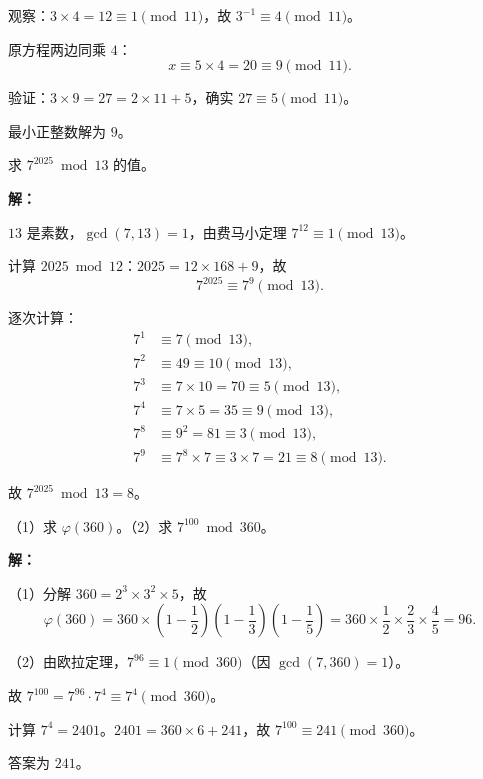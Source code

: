 \documentclass[12pt, a4paper]{ctexart}
\begin{document}
观察：$3 \times 4 = 12 \equiv 1 \pmod{11}$，故 $3^{-1} \equiv 4 \pmod{11}$。

原方程两边同乘 $4$：
\[ x \equiv 5 \times 4 = 20 \equiv 9 \pmod{11}. \]

验证：$3 \times 9 = 27 = 2 \times 11 + 5$，确实 $27 \equiv 5 \pmod{11}$。

最小正整数解为 $\boxed{9}$。

\begin{examplebox}[【例题5】费马小定理应用]
求 $7^{2025} \bmod 13$ 的值。
\end{examplebox}

\textbf{解：}

$13$ 是素数，$\gcd(7, 13) = 1$，由费马小定理 $7^{12} \equiv 1 \pmod{13}$。

计算 $2025 \bmod 12$：$2025 = 12 \times 168 + 9$，故
\[ 7^{2025} \equiv 7^9 \pmod{13}. \]

逐次计算：
\begin{align*}
7^1 &\equiv 7 \pmod{13}, \\
7^2 &\equiv 49 \equiv 10 \pmod{13}, \\
7^3 &\equiv 7 \times 10 = 70 \equiv 5 \pmod{13}, \\
7^4 &\equiv 7 \times 5 = 35 \equiv 9 \pmod{13}, \\
7^8 &\equiv 9^2 = 81 \equiv 3 \pmod{13}, \\
7^9 &\equiv 7^8 \times 7 \equiv 3 \times 7 = 21 \equiv 8 \pmod{13}.
\end{align*}

故 $7^{2025} \bmod 13 = \boxed{8}$。

\begin{examplebox}[【例题6】欧拉函数与欧拉定理]
（1）求 $\varphi(360)$。\quad （2）求 $7^{100} \bmod 360$。
\end{examplebox}

\textbf{解：}

（1）分解 $360 = 2^3 \times 3^2 \times 5$，故
\[ \varphi(360) = 360 \times \left(1 - \frac{1}{2}\right)\left(1 - \frac{1}{3}\right)\left(1 - \frac{1}{5}\right) = 360 \times \frac{1}{2} \times \frac{2}{3} \times \frac{4}{5} = 96. \]

（2）由欧拉定理，$7^{96} \equiv 1 \pmod{360}$（因 $\gcd(7, 360) = 1$）。

故 $7^{100} = 7^{96} \cdot 7^4 \equiv 7^4 \pmod{360}$。

计算 $7^4 = 2401$。$2401 = 360 \times 6 + 241$，故 $7^{100} \equiv 241 \pmod{360}$。

答案为 $\boxed{241}$。
\end{document}
